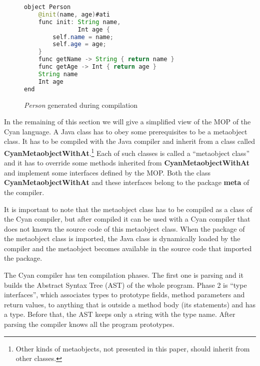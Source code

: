 \documentclass[preprint,review]{elsarticle}
\newcommand{\srcstyle}[1]{\ttfamily\textbf{#1}\rmfamily}
\begin{document}
\begin{figure}[h]
\centering
\begin{lstlisting}[language=Java]
object Person
    @init(name, age)#ati
    func init: String name,
               Int age {
        self.name = name;
        self.age = age;
    }
    func getName -> String { return name }
    func getAge -> Int { return age }
    String name
    Int age
end
\end{lstlisting}
\caption{\textit{Person} generated during compilation}
\label{fig:ObservableCompilerCyan}
\end{figure}


In the remaining of this section we will give a simplified view of the MOP of the Cyan
language. A Java  class has to obey
some prerequisites to be a metaobject class. It has to be compiled with
the Java compiler and inherit
from  a  class called  \srcstyle{CyanMetaobjectWithAt}.\footnote{Other
  kinds of  metaobjects, not presented  in this paper,  should inherit
  from  other classes.}   Each of such classes  is  called a  ``metaobject
class'' and  it has to
override some methods inherited from  \srcstyle{CyanMetaobjectWithAt}
and  implement some  interfaces defined  by the  MOP.  Both  the class
\srcstyle{CyanMetaobjectWithAt} and these interfaces belong to the package
\srcstyle{meta} of the compiler.

\begin{comment}
CyanMetaobjectWithAt
IActionProgramUnit_ati (rename, create new method)
\srcstyle{IActionNewPrototypes\_ati} (create new prototype)
attache to method, prototype, etc

\end{comment}

It is important  to note that the metaobject class  has to be compiled
as a  class of the  Cyan compiler, but after  compiled it can  be used
with  a Cyan  compiler that  does not  known the  source code  of this
metaobject  class.  When  the  package  of  the  metaobject  class  is
imported, the Java class is dynamically loaded by the compiler and the
metaobject  becomes available  in the  source code  that imported  the
package.

The Cyan compiler has ten compilation phases. The first one is parsing
and it builds the Abstract Syntax Tree (AST) of the whole program.
Phase 2 is ``type interfaces'', which associates types to prototype fields, method parameters and return values, to anything that is outside a method body (its statements) and has a type. Before that, the AST keeps only a string with the type name. After parsing the compiler knows all the program prototypes.
\end{document}
